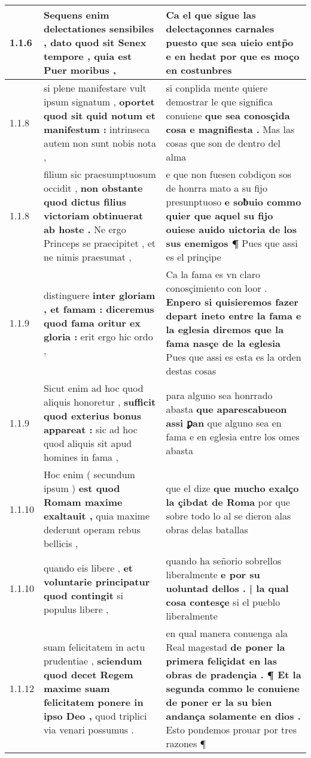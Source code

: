 \begin{tabular}{|p{1cm}|p{6.5cm}|p{6.5cm}|}
1.1.6 & Sequens enim delectationes sensibiles , \textbf{ dato quod sit Senex tempore , } quia est Puer moribus , & Ca el que sigue las delectaçonnes carnales \textbf{ puesto que sea uieio entp̃o e en hedat } por que es moço en costunbres \\\hline
1.1.8 & si plene manifestare vult ipsum signatum , \textbf{ oportet quod sit quid notum et manifestum : } intrinseca autem non sunt nobis nota , & si conplida mente quiere demostrar le que significa conuiene \textbf{ que sea conosçida cosa e magnifiesta . } Mas las cosas que son de dentro del alma \\\hline
1.1.8 & filium sic praesumptuosum occidit , \textbf{ non obstante quod dictus filius victoriam obtinuerat ab hoste . } Ne ergo Princeps se praecipitet , et ne nimis praesumat , & e que non fuesen cobdiçon sos de honrra mato a su fijo presunptuoso \textbf{ e soƀuio commo quier que aquel su fijo ouiese auido uictoria de los sus enemigos ¶ } Pues que assi es el prinçipe \\\hline
1.1.9 & distinguere \textbf{ inter gloriam , et famam : diceremus quod fama oritur ex gloria : } erit ergo hic ordo , & Ca la fama es vn claro conosçimiento con loor . \textbf{ Enpero si quisieremos fazer depart ineto entre la fama e la eglesia diremos que la fama nasçe de la eglesia } Pues que assi es esta es la orden destas cosas \\\hline
1.1.9 & Sicut enim ad hoc quod aliquis honoretur , \textbf{ sufficit quod exterius bonus appareat : } sic ad hoc quod aliquis sit apud homines in fama , & para alguno sea honrrado abasta \textbf{ que aparescabueon assi ꝑan } que alguno sea en fama e en eglesia entre los omes abasta \\\hline
1.1.10 & Hoc enim ( secundum ipsum ) \textbf{ est quod Romam maxime exaltauit , } quia maxime dederunt operam rebus bellicis , & que el dize \textbf{ que mucho exalço la çibdat de Roma } por que sobre todo lo al se dieron alas obras delas batallas \\\hline
1.1.10 & quando eis libere , \textbf{ et voluntarie principatur quod contingit } si populus libere , & quando ha señorio sobrellos liberalmente \textbf{ e por su uoluntad dellos . | la qual cosa contesçe } si el pueblo liberalmente \\\hline
1.1.12 & suam felicitatem in actu prudentiae , \textbf{ sciendum quod decet Regem maxime suam felicitatem ponere in ipso Deo , } quod triplici via venari possumus . & en qual manera conuenga ala Real magestad \textbf{ de poner la primera feliçidat en las obras de pradençia . ¶ Et la segunda commo le conuiene de poner er la su bien andança solamente en dios . } Esto pondemos prouar por tres razones ¶ \\\hline

\end{tabular}
